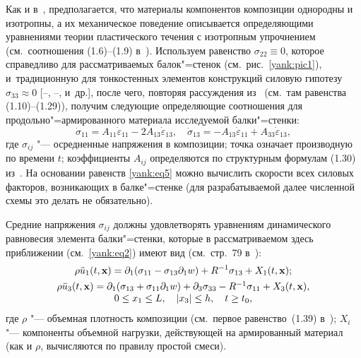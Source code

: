 Как и в~\cite{yank:bib13}, предполагается, что материалы компонентов композиции однородны
и изотропны, а их механическое поведение описывается определяющими
уравнениями теории пластического течения с изотропным упрочнением (см.~соотношения (1.6)--(1.9) в~\cite{yank:bib13}). 
Используем равенство $\sigma _{22} \equiv 0$, которое справедливо для рассматриваемых балок"=стенок (см.~рис.~\ref{yank:pic1}), и~традиционную для тонкостенных элементов конструкций силовую гипотезу $\sigma
_{33} \approx 0$ [--, --,  и~др.], после чего, повторяя рассуждения
из~\cite{yank:bib13} (см.~там равенства (1.10)--(1.29)), получим следующие определяющие
соотношения для продольно"=армированного материала исследуемой балки"=стенки:
\begin{equation}
\label{yank:eq5}
\dot {\sigma }_{11} =A_{11} \dot {\varepsilon }_{11} -2A_{13} \dot
{\varepsilon }_{13} ,\quad \dot {\sigma }_{13} =-A_{13} \dot
{\varepsilon }_{11} +A_{33} \dot {\varepsilon }_{13},
\end{equation}
где $\sigma _{ij} $  "---  осредненные напряжения в композиции; точка означает
производную по времени $t$; коэффициенты $A_{ij}$ определяются по структурным
формулам (1.30) из~\cite{yank:bib13}. На основании равенств \eqref{yank:eq5} можно вычислить скорости
всех силовых факторов, возникающих в балке"=стенке (для разрабатываемой далее
численной схемы это делать не обязательно).

Средние напряжения $\sigma _{ij}$ должны удовлетворять уравнениям
динамического равновесия элемента балки"=стенки, которые в рассматриваемом
здесь приближении (см.~\eqref{yank:eq2}) имеют вид (см.~стр.~79 в~\cite{yank:bib18}):
\begin{gather}
\label{yank:eq6}
\rho \ddot {u}_1 (t,{\bf x})=\partial _1 (\sigma _{11} -\sigma _{13} \partial _1 w )+R^{-1}\sigma _{13} +X_1
(t, {\bf x});
\\
\label{yank:eq7}
\begin{array}{c}
 \rho \ddot {u}_3 (t,{\bf x} ) =\partial _1 ( \sigma _{13} +\sigma _{11} \partial _1 w )+\partial _3 \sigma _{33}
-R^{-1}\sigma _{11} +X_3 (t,{\bf x} ), \\
0\le x_1 \le L,\quad |x_3 |\le h,\quad t\ge t_0,
 \end{array}
\end{gather}
где $\rho $  "---  объемная плотность композиции (см.~первое равенство~(1.39) в~\cite{yank:bib13}); $X_i $ "--- компоненты объемной нагрузки, действующей на армированный
материал (как и $\rho $, вычисляются по правилу простой смеси).

